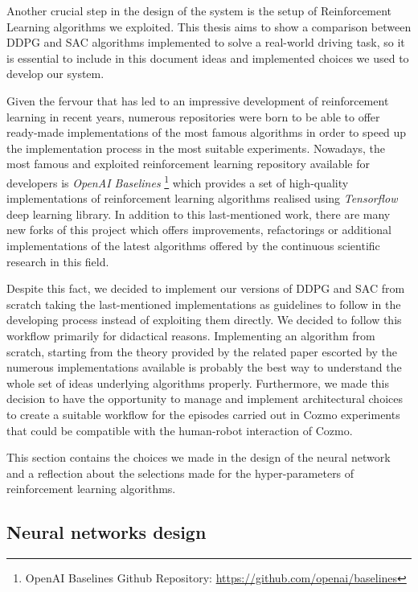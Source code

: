 Another crucial step in the design of the system is the setup of Reinforcement Learning algorithms we exploited.
This thesis aims to show a comparison between DDPG and SAC algorithms implemented to solve a real-world driving task, so it is essential to include in this document ideas and implemented choices we used to develop our system.

Given the fervour that has led to an impressive development of reinforcement learning in recent years, numerous repositories were born to be able to offer ready-made implementations of the most famous algorithms in order to speed up the implementation process in the most suitable experiments.
Nowadays, the most famous and exploited reinforcement learning repository available for developers is \textit{OpenAI Baselines} \footnote{OpenAI Baselines Github Repository: \href{https://github.com/openai/baselines}{https://github.com/openai/baselines}} which provides a set of high-quality implementations of reinforcement learning algorithms realised using \textit{Tensorflow} deep learning library.
In addition to this last-mentioned work, there are many new forks of this project which offers improvements, refactorings or additional implementations of the latest algorithms offered by the continuous scientific research in this field.

Despite this fact, we decided to implement our versions of DDPG and SAC from scratch taking the last-mentioned implementations as guidelines to follow in the developing process instead of exploiting them directly.
We decided to follow this workflow primarily for didactical reasons.
Implementing an algorithm from scratch, starting from the theory provided by the related paper escorted by the numerous implementations available is probably the best way to understand the whole set of ideas underlying algorithms properly.
Furthermore, we made this decision to have the opportunity to manage and implement architectural choices to create a suitable workflow for the episodes carried out in Cozmo experiments that could be compatible with the human-robot interaction of Cozmo.

This section contains the choices we made in the design of the neural network and a reflection about the selections made for the hyper-parameters of reinforcement learning algorithms.

\subsection{Neural networks design}

